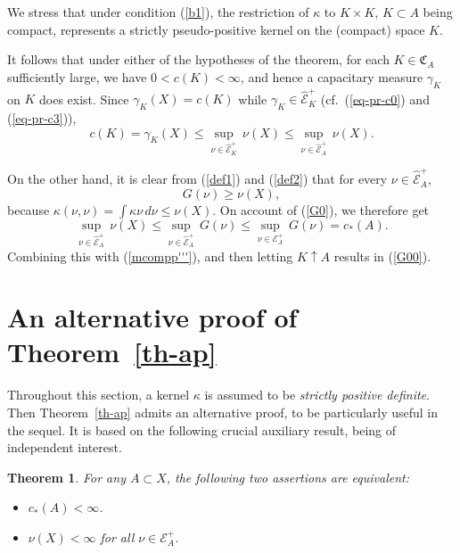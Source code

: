 \documentclass[12pt,a4paper,reqno]{amsart} %
\theoremstyle{lause}
\theoremstyle{maaritelma}
\theoremstyle{lause}
\newtheorem{theorem}{Theorem}[section]
\theoremstyle{maaritelma}
\numberwithin{equation}{section}
\begin{document}
We stress that  under condition (\ref{b1}), the restriction of $\kappa$ to $K\times K$, $K\subset A$ being compact, represents a strictly pse\-udo-pos\-itive kernel on the (compact) space $K$.

It follows that under either of the hypotheses of the theorem, for each $K\in\mathfrak C_A$ sufficiently large, we have $0<c(K)<\infty$, and hence a capacitary measure $\gamma_K$ on $K$ does exist. Since $\gamma_K(X)=c(K)$ while $\gamma_K\in\widehat{\mathcal E}^+_K$ (cf.\ (\ref{eq-pr-c0}) and (\ref{eq-pr-c3})),
\begin{equation}\label{mcompp'''}c(K)=\gamma_K(X)\leqslant\sup_{\nu\in\widehat{\mathcal E}^+_K}\,\nu(X)\leqslant\sup_{\nu\in\widehat{\mathcal E}^+_A}\,\nu(X).\end{equation}

On the other hand, it is clear from (\ref{def1}) and (\ref{def2}) that for every $\nu\in\widehat{\mathcal E}^+_A$,
\begin{equation}\label{estt}
G(\nu)\geqslant\nu(X),\end{equation}
because $\kappa(\nu,\nu)=\int\kappa\nu\,d\nu\leqslant\nu(X)$. On account of (\ref{G0}), we therefore get
\begin{equation}\label{mcompp''}
  \sup_{\nu\in\widehat{\mathcal E}^+_A}\,\nu(X)\leqslant\sup_{\nu\in\widehat{\mathcal E}^+_A}\,G(\nu)\leqslant\sup_{\nu\in\mathcal E^+_A}\,G(\nu)=c_*(A).
\end{equation}
Combining this with (\ref{mcompp'''}), and then letting $K\uparrow A$ results in (\ref{G00}).


\section{An alternative proof of Theorem~\ref{th-ap}}\label{sec-further}

Throughout this section, a kernel $\kappa$ is assumed to be {\it strictly positive definite}.
Then Theorem~\ref{th-ap} admits an alternative proof, to be particularly useful in the sequel.
It is based on the following crucial auxiliary result, being of independent interest.

\begin{theorem}\label{capf} For any\/ $A\subset X$,
the following two assertions are equivalent:
\begin{itemize}
   \item[{\rm(i)}] $c_*(A)<\infty$.
   \item[{\rm(ii)}] $\nu(X)<\infty$ for all\/ $\nu\in\mathcal E^+_A$.
   \end{itemize}
\end{theorem}
\end{document}
